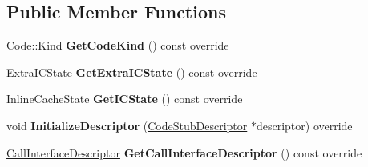 \subsection*{Public Member Functions}
\begin{DoxyCompactItemize}
\item 
Code\+::\+Kind {\bfseries Get\+Code\+Kind} () const  override\hypertarget{classv8_1_1internal_1_1_handler_stub_a7406b1c3c18bc5ff46e57814a01e6444}{}\label{classv8_1_1internal_1_1_handler_stub_a7406b1c3c18bc5ff46e57814a01e6444}

\item 
Extra\+I\+C\+State {\bfseries Get\+Extra\+I\+C\+State} () const  override\hypertarget{classv8_1_1internal_1_1_handler_stub_a6c2e31da5a572ac156addfaaae05a024}{}\label{classv8_1_1internal_1_1_handler_stub_a6c2e31da5a572ac156addfaaae05a024}

\item 
Inline\+Cache\+State {\bfseries Get\+I\+C\+State} () const  override\hypertarget{classv8_1_1internal_1_1_handler_stub_ad583d88dbb1f649834122207c0eafe93}{}\label{classv8_1_1internal_1_1_handler_stub_ad583d88dbb1f649834122207c0eafe93}

\item 
void {\bfseries Initialize\+Descriptor} (\hyperlink{classv8_1_1internal_1_1_code_stub_descriptor}{Code\+Stub\+Descriptor} $\ast$descriptor) override\hypertarget{classv8_1_1internal_1_1_handler_stub_ae94ca40794f683cb4012c63bbb720015}{}\label{classv8_1_1internal_1_1_handler_stub_ae94ca40794f683cb4012c63bbb720015}

\item 
\hyperlink{classv8_1_1internal_1_1_call_interface_descriptor}{Call\+Interface\+Descriptor} {\bfseries Get\+Call\+Interface\+Descriptor} () const  override\hypertarget{classv8_1_1internal_1_1_handler_stub_af8ce9a3fd038d687bd24457d4e4c0152}{}\label{classv8_1_1internal_1_1_handler_stub_af8ce9a3fd038d687bd24457d4e4c0152}

\end{DoxyCompactItemize}
